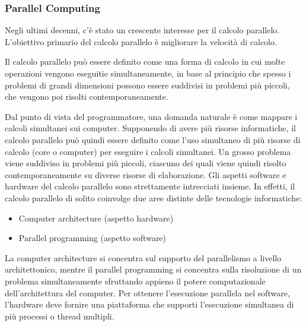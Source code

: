 \subsubsection{Parallel Computing}
Negli ultimi decenni, c'è stato un crescente interesse per il calcolo parallelo. L'obiettivo primario del calcolo parallelo è migliorare la velocità di calcolo.

Il calcolo parallelo può essere definito come una forma di calcolo in cui molte operazioni vengono eseguitie simultaneamente, in base al principio che spesso i problemi di grandi dimensioni possono essere suddivisi in problemi più piccoli, che vengono poi risolti contemporaneamente.

Dal punto di vista del programmatore, una domanda naturale è come mappare i calcoli simultanei sui computer. Supponendo di avere più risorse informatiche, il calcolo parallelo può quindi essere definito come l'uso simultaneo di più risorse di calcolo (core o computer) per eseguire i calcoli simultanei. Un grosso problema viene suddiviso in problemi più piccoli, ciascuno dei quali viene quindi risolto contemporaneamente su diverse risorse di elaborazione. Gli aspetti software e hardware del calcolo parallelo sono strettamente intrecciati insieme. In effetti, il calcolo parallelo di solito coinvolge due aree distinte delle tecnologie informatiche:
\begin{itemize}
	\item Computer architecture (aspetto hardware)
	\item Parallel programming (aspetto software)
\end{itemize}
La computer architecture si concentra sul supporto del parallelismo a livello architettonico, mentre il parallel programming si concentra sulla risoluzione di un problema simultaneamente sfruttando appieno il potere computazionale dell'architettura del computer. Per ottenere l'esecuzione parallela nel software, l'hardware deve fornire una piattaforma che supporti l'esecuzione simultanea di più processi o thread multipli.


